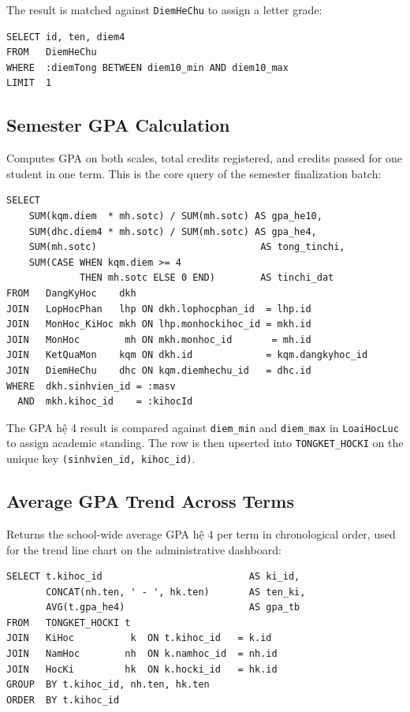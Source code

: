 \documentclass[12pt,a4paper]{report}
\begin{document}
The result is matched against \texttt{DiemHeChu} to assign a letter grade:

\begin{verbatim}
SELECT id, ten, diem4
FROM   DiemHeChu
WHERE  :diemTong BETWEEN diem10_min AND diem10_max
LIMIT  1
\end{verbatim}

\subsection{Semester GPA Calculation}

Computes GPA on both scales, total credits registered, and credits passed for one student in one term. This is the core query of the semester finalization batch:

\begin{verbatim}
SELECT
    SUM(kqm.diem  * mh.sotc) / SUM(mh.sotc) AS gpa_he10,
    SUM(dhc.diem4 * mh.sotc) / SUM(mh.sotc) AS gpa_he4,
    SUM(mh.sotc)                             AS tong_tinchi,
    SUM(CASE WHEN kqm.diem >= 4
             THEN mh.sotc ELSE 0 END)        AS tinchi_dat
FROM   DangKyHoc    dkh
JOIN   LopHocPhan   lhp ON dkh.lophocphan_id  = lhp.id
JOIN   MonHoc_KiHoc mkh ON lhp.monhockihoc_id = mkh.id
JOIN   MonHoc        mh ON mkh.monhoc_id       = mh.id
JOIN   KetQuaMon    kqm ON dkh.id             = kqm.dangkyhoc_id
JOIN   DiemHeChu    dhc ON kqm.diemhechu_id   = dhc.id
WHERE  dkh.sinhvien_id = :masv
  AND  mkh.kihoc_id    = :kihocId
\end{verbatim}

The GPA hệ 4 result is compared against \texttt{diem\_min} and \texttt{diem\_max} in \texttt{LoaiHocLuc} to assign academic standing. The row is then upserted into \texttt{TONGKET\_HOCKI} on the unique key \texttt{(sinhvien\_id, kihoc\_id)}.

\subsection{Average GPA Trend Across Terms}

Returns the school-wide average GPA hệ 4 per term in chronological order, used for the trend line chart on the administrative dashboard:

\begin{verbatim}
SELECT t.kihoc_id                          AS ki_id,
       CONCAT(nh.ten, ' - ', hk.ten)       AS ten_ki,
       AVG(t.gpa_he4)                      AS gpa_tb
FROM   TONGKET_HOCKI t
JOIN   KiHoc          k  ON t.kihoc_id   = k.id
JOIN   NamHoc        nh  ON k.namhoc_id  = nh.id
JOIN   HocKi         hk  ON k.hocki_id   = hk.id
GROUP  BY t.kihoc_id, nh.ten, hk.ten
ORDER  BY t.kihoc_id
\end{verbatim}
\end{document}
